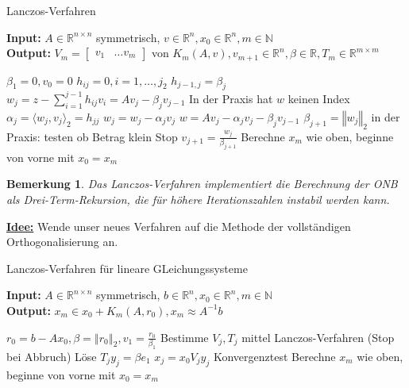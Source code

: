 \documentclass{book}
\newtheorem{remark}[algorithm]{Bemerkung}
\def\R{\mathbb{R}}
\def\N{\mathbb{N}}
\begin{document}
            \begin{algorithm}[H] %
                \caption{Lanczos-Verfahren}\label{a3.22}
                \textbf{Input:} $A\in\R^{n\times n}$ symmetrisch, $v\in\R^n,x_0\in\R^n,m\in\N$\\
                \textbf{Output:} $V_m=\begin{bmatrix}
                    v_1 & \dots v_m
                \end{bmatrix}$ von $K_m(A,v), v_{m+1}\in\R^n,\beta\in\R,T_m\in\R^{m\times m}$
                \begin{algorithmic}
                \State $\beta_1=0,v_0=0$
                    \State $h_{ij}=0,i=1,\dots,j_2$
                    \State $h_{j-1,j}=\beta_j$
                    \State $w_j=z-\sum_{i=1}^{j-1}h_{ij}v_i=Av_j-\beta_jv_{j-1}$ \Comment In der Praxis hat $w$ keinen Index
                    \State $\alpha_j = \langle w_j, v_j\rangle_2=h_{jj}$
                    \State $w_j=w_j-\alpha_j v_j$ \Comment $w=Av_j-\alpha_jv_j-\beta_jv_{j-1}$
                    \State $\beta_{j+1}=\left\Vert w_j \right\Vert_2$
                     \Comment in der Praxis: testen ob Betrag klein
                        \State Stop  
                    \EndIf
                    $v_{j+1}=\frac{w_j}{\beta_{j+1}}$
                \EndFor
                \State Berechne $x_m$ wie oben, beginne von vorne mit $x_0=x_m$
                \end{algorithmic}
            \end{algorithm}

            \begin{remark}\label{b3.23}
                Das Lanczos-Verfahren implementiert die Berechnung der ONB als Drei-Term-Rekursion,
                die für höhere Iterationszahlen instabil werden kann.
            \end{remark}

            \underline{\textbf{Idee:}} Wende unser neues Verfahren auf die Methode der vollständigen
            Orthogonalisierung an.

            \begin{algorithm}[H] %
                \caption{Lanczos-Verfahren für lineare GLeichungssysteme}\label{a3.24}
                \textbf{Input:} $A\in\R^{n\times n}$ symmetrisch, $b\in\R^n,x_0\in\R^n,m\in\N$\\
                \textbf{Output:} $x_m\in x_0 +K_m(A,r_0), x_m\approx A^{-1}b$
                \begin{algorithmic}
                \State $r_0=b-Ax_0,\beta=\left\Vert r_0 \right\Vert_2,v_1=\frac{r_0}{\beta_1}$
                    \State Bestimme $V_j,T_j$ mittel Lanczos-Verfahren (Stop bei Abbruch)
                    \State Löse $T_jy_j = \beta e_1$
                    \State $x_j =x_0 V_jy_j$
                    \State Konvergenztest
                \EndFor
                \State Berechne $x_m$ wie oben, beginne von vorne mit $x_0=x_m$
                \end{algorithmic}
            \end{algorithm}
\end{document}

